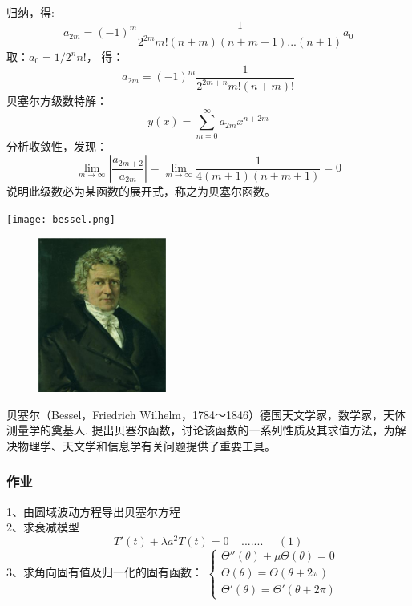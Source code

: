 \begin{frame}
	归纳，得:
	\begin{equation*}
		a_{2m}=(-1)^m  \frac{1}{2^{2m} m! (n+m) (n+m-1)... (n+1) } a_0 
	\end{equation*}	
	取：$a_0=1/2^n n!$， 得：
	\begin{equation*}
		a_{2m}=(-1)^m  \frac{1}{2^{2m+n} m! (n+m) ! }
	\end{equation*}	
	贝塞尔方级数特解：
	\begin{equation*}
		y(x) = \sum\limits_{m=0}^{\infty} a_{2m} x^{n+2m} 
	\end{equation*}	
	分析收敛性，发现：
	\begin{equation*}
		\lim\limits_{m\to \infty}|\frac{ a_{2m+2}} {a_{2m}}|= \lim\limits_{m\to \infty}\frac{ 1}{4(m+1)(n+m+1)} =0
	\end{equation*}	
	说明此级数必为某函数的展开式，称之为贝塞尔函数。
\end{frame}	

\begin{frame}
	\texttt{[image: bessel.png]}
\end{frame}	

\begin{frame}
	\begin{center}
		\begin{figure}
			\includegraphics[width=4.2cm]{figs/fig1-3-6.png}	
		\end{figure}
	\end{center}
	贝塞尔（Bessel，Friedrich Wilhelm，1784～1846）德国天文学家，数学家，天体测量学的奠基人.
	提出贝塞尔函数，讨论该函数的一系列性质及其求值方法，为解决物理学、天文学和信息学有关问题提供了重要工具。
\end{frame}

\begin{frame}
	\frametitle{作业}
	1、由圆域波动方程导出贝塞尔方程\\
	2、求衰减模型
	\begin{equation*}
		T'(t)+\lambda a^2T(t)=0  ~~~~~....... ~~~~~~(1)
	\end{equation*}
	3、求角向固有值及归一化的固有函数：
	$ \begin{cases}
		\Theta ''(\theta)+\mu \Theta (\theta) =0 \\
		\Theta (\theta) =	\Theta (\theta+2\pi)  \\
		\Theta' (\theta) =	\Theta' (\theta+2\pi)  
	\end{cases} $	
\end{frame}	

